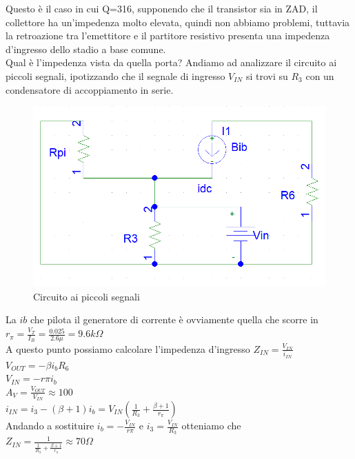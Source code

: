 \documentclass{article}
\begin{document}
Questo è il caso in cui Q=316, supponendo che il transistor sia in ZAD, il collettore ha un'impedenza molto elevata, quindi non abbiamo problemi, tuttavia la retroazione tra l'emettitore e il partitore resistivo presenta una impedenza d'ingresso dello stadio a base comune.\\
Qual è l'impedenza vista da quella porta? Andiamo ad analizzare il circuito ai piccoli segnali, ipotizzando che il segnale di ingresso $V_{IN}$ si trovi su $R_3$ con un condensatore di accoppiamento in serie.
~\begin{figure}[H]
\includegraphics[scale=0.5]{PiccoliSegnali.png}
\centering
\caption{Circuito ai piccoli segnali}
\label{fig:foo}
\end{figure}
La $ib$ che pilota il generatore di corrente è ovviamente quella che scorre in $r_\pi=\frac{V_T}{I_B}=\frac{0.025}{2.6\mu }=9.6k\Omega$\\
A questo punto possiamo calcolare l'impedenza d'ingresso $Z_{IN}=\frac{V_{IN}}{i_{IN}}$\\
$V_{OUT}=- \beta i_b R_6$\\$V_{IN}=-r \pi i_b$\\
$A_V=\frac{V_{OUT}}{V_{IN}}\approx 100$\\
$i_{IN}=i_3-(\beta +1)i_b=V_{IN}(\frac{1}{R_3}+\frac{\beta +1}{r_\pi})$\\
Andando a sostituire $i_b=-\frac{V_{IN}}{r\pi}$ e $i_3=\frac{V_{IN}}{R_3}$ otteniamo che \\
$Z_{IN}=\frac{1}{\frac{1}{R_3}+\frac{\beta +1}{r_\pi}}\approx 70\Omega$
\end{document}
